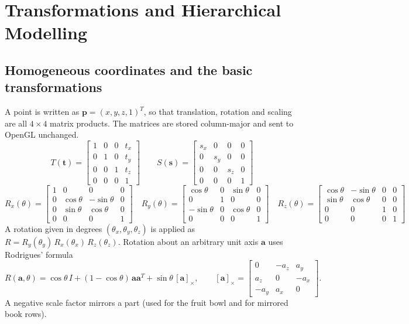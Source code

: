 \section{Transformations and Hierarchical Modelling}\label{sec:transform}
\subsection{Homogeneous coordinates and the basic transformations}
A point is written as $\mathbf{p}=(x,y,z,1)^T$, so that translation, rotation and scaling are all
$4\times4$ matrix products. The matrices are stored column-major and sent to OpenGL unchanged.
\[
T(\mathbf{t})=\begin{bmatrix}1&0&0&t_x\\0&1&0&t_y\\0&0&1&t_z\\0&0&0&1\end{bmatrix}\qquad
S(\mathbf{s})=\begin{bmatrix}s_x&0&0&0\\0&s_y&0&0\\0&0&s_z&0\\0&0&0&1\end{bmatrix}
\]
\[
R_x(\theta)=\begin{bmatrix}1&0&0&0\\0&\cos\theta&-\sin\theta&0\\0&\sin\theta&\cos\theta&0\\0&0&0&1\end{bmatrix}\quad
R_y(\theta)=\begin{bmatrix}\cos\theta&0&\sin\theta&0\\0&1&0&0\\-\sin\theta&0&\cos\theta&0\\0&0&0&1\end{bmatrix}\quad
R_z(\theta)=\begin{bmatrix}\cos\theta&-\sin\theta&0&0\\\sin\theta&\cos\theta&0&0\\0&0&1&0\\0&0&0&1\end{bmatrix}
\]
A rotation given in degrees $(\theta_x,\theta_y,\theta_z)$ is applied as $R=R_y(\theta_y)\,R_x(\theta_x)\,R_z(\theta_z)$.
Rotation about an arbitrary unit axis $\mathbf{a}$ uses Rodrigues' formula
\[
R(\mathbf{a},\theta) = \cos\theta\,I + (1-\cos\theta)\,\mathbf{a}\mathbf{a}^T + \sin\theta\,[\mathbf{a}]_\times,\qquad
[\mathbf{a}]_\times=\begin{bmatrix}0&-a_z&a_y\\a_z&0&-a_x\\-a_y&a_x&0\end{bmatrix}.
\]
A negative scale factor mirrors a part (used for the fruit bowl and for mirrored book rows).

